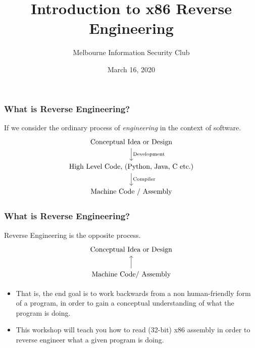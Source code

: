 \documentclass{beamer}
\begin{document}
\title{Introduction to x86 Reverse Engineering}
\author{Melbourne Information Security Club}
\date{March 16, 2020}
\frame{\titlepage}
\begin{frame}[fragile]
  \frametitle{What is Reverse Engineering?}
  If we consider the ordinary process of \textit{engineering} in the
  context of software.
  \[
  \begin{tikzcd}
    \text{Conceptual Idea or Design} \arrow[d, "\text{Development}"]              \\
    {\text{High Level Code, (Python, Java, C etc.)}} \arrow[d, "\text{Compiler}"] \\
    \text{Machine Code / Assembly}
  \end{tikzcd}
  \]
\end{frame}

\begin{frame}[fragile]
  \frametitle{What is Reverse Engineering?}
  Reverse Engineering is the opposite process.
  \[
  \begin{tikzcd}
    \text{Conceptual Idea or Design}                           \\
    \text{Machine Code/ Assembly} \arrow[u]
  \end{tikzcd}
  \]
  \begin{itemize}
    \item That is, the end goal is to work backwards from a
    non human-friendly form of a program, in order to gain a conceptual understanding of what the
    program is doing.
    \item This workshop will teach you how to read (32-bit) x86 assembly in order
    to reverse engineer what a given program is doing.
  \end{itemize}
\end{frame}
\end{document}
